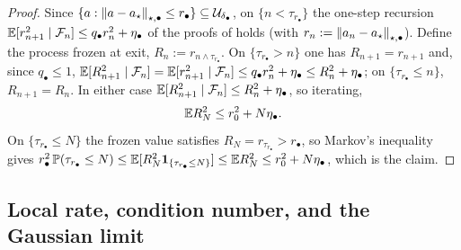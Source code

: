 \begin{proof}
Since $\{a:\left\lVert a-a_\star\right\rVert_{\star,\bullet}\leq r_\bullet\}\subseteq\mathcal{U}_{\delta_\bullet}$, on
$\{n<\tau_{r_\bullet}\}$ the one-step recursion
$\mathbb{E}[r_{n+1}^2\mid\mathcal{F}_n]\leq q_\bullet r_n^2+\eta_\bullet$ of the proofs of
 holds (with
$r_n:=\left\lVert a_n-a_\star\right\rVert_{\star,\bullet}$). Define the process frozen at exit,
$R_n:=r_{n\wedge\tau_{r_\bullet}}$. On $\{\tau_{r_\bullet}>n\}$ one has $R_{n+1}=r_{n+1}$ and, since
$q_\bullet\leq1$,
$\mathbb{E}[R_{n+1}^2\mid\mathcal{F}_n]=\mathbb{E}[r_{n+1}^2\mid\mathcal{F}_n]\leq q_\bullet r_n^2+\eta_\bullet\leq R_n^2+\eta_\bullet$;
on $\{\tau_{r_\bullet}\leq n\}$, $R_{n+1}=R_n$. In either case
$\mathbb{E}[R_{n+1}^2\mid\mathcal{F}_n]\leq R_n^2+\eta_\bullet$, so iterating,
\[
    \mathbb{E} R_N^2\leq r_0^2+N\eta_\bullet .
\]
On $\{\tau_{r_\bullet}\leq N\}$ the frozen value satisfies $R_N=r_{\tau_{r_\bullet}}>r_\bullet$, so
Markov's inequality gives
$r_\bullet^2\,\mathbb{P}(\tau_{r_\bullet}\leq N)\leq\mathbb{E}[R_N^2\mathbf1_{\{\tau_{r_\bullet}\leq N\}}]\leq\mathbb{E} R_N^2\leq r_0^2+N\eta_\bullet$,
which is the claim.
\end{proof}

\subsection{Local rate, condition number, and the Gaussian limit}
\label{subsec:local-condnum}

